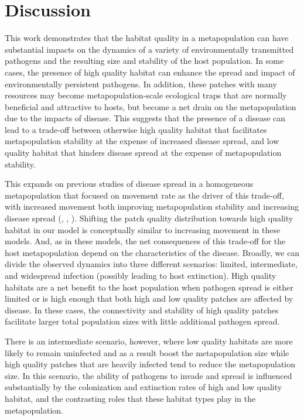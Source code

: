 \documentclass{article}
\begin{document}
\section{Discussion}
\label{discussion} 

This work demonstrates that the habitat quality in a metapopulation can have substantial impacts on the dynamics of a variety of environmentally transmitted pathogens and the resulting size and stability of the host population.
In some cases, the presence of high quality habitat can enhance the spread and impact of environmentally persistent pathogens.  
In addition, these patches with many resources may become metapopulation-scale ecological traps that are normally beneficial and attractive to hosts, but become a net drain on the metapopulation due to the impacts of disease. 
This suggests that the presence of a disease can lead to a trade-off between otherwise high quality habitat that facilitates metapopulation stability at the expense of increased disease spread, and low quality habitat that hinders disease spread at the expense of metapopulation stability.

This expands on previous studies of disease spread in a homogeneous metapopulation that focused on movement rate as the driver of this trade-off, with increased movement both improving metapopulation stability and increasing disease spread (\cite{Hess1996}, \cite{Gog2002}, \cite{Park2012}).  
Shifting the patch quality distribution towards high quality habitat in our model is conceptually similar to increasing movement in these models.
And, as in these models, the net consequences of this trade-off for the host metapopulation depend on the characteristics of the disease.
Broadly, we can divide the observed dynamics into three different scenarios: limited, intermediate, and widespread infection (possibly leading to host extinction). 
High quality habitats are a net benefit to the host population when pathogen spread is either limited or is high enough that both high and low quality patches are affected by disease. 
In these cases, the connectivity and stability of high quality patches facilitate larger total population sizes with little additional pathogen spread.

There is an intermediate scenario, however, where low quality habitats are more likely to remain uninfected and as a result boost the metapopulation size while high quality patches that are heavily infected tend to reduce the metapopulation size. 
In this scenario, the ability of pathogens to invade and spread is influenced substantially by the colonization and extinction rates of high and low quality habitat, and the contrasting roles that these habitat types play in the metapopulation.
\end{document}
